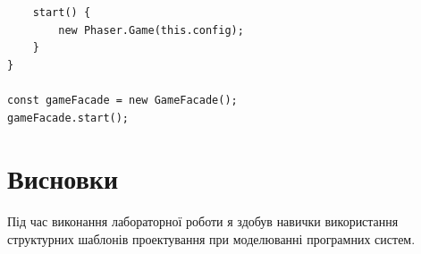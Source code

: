 \documentclass[oneside,14pt]{extarticle}
\begin{document}
\begin{normalsize}
\begin{small}
\begin{lstlisting}
	start() {
		new Phaser.Game(this.config);
	}
}

const gameFacade = new GameFacade();
gameFacade.start();

		\end{lstlisting}
	\end{small}
	
	\section*{Висновки}
	   Під час виконання лабораторної роботи я здобув навички використання структурних шаблонів проектування при моделюванні програмних систем.
\end{normalsize}
\end{document}
